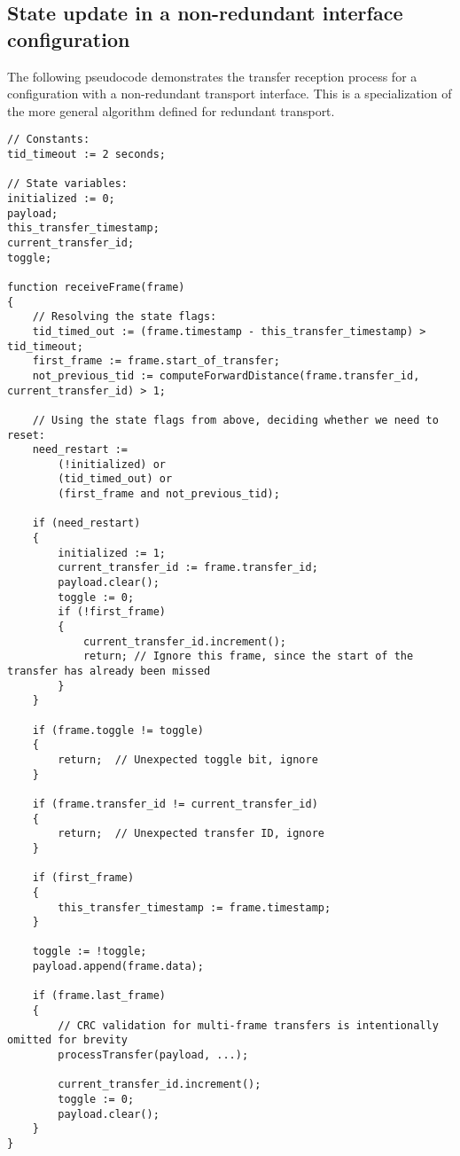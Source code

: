 \subsection{State update in a non-redundant interface configuration}
\label{sec:transfer_reception_state_update_non_redundant}

The following pseudocode demonstrates the transfer reception process for a configuration
with a non-redundant transport interface.
This is a specialization of the more general algorithm defined for redundant transport.

\clearpage
\begin{verbatim}
// Constants:
tid_timeout := 2 seconds;

// State variables:
initialized := 0;
payload;
this_transfer_timestamp;
current_transfer_id;
toggle;

function receiveFrame(frame)
{
    // Resolving the state flags:
    tid_timed_out := (frame.timestamp - this_transfer_timestamp) > tid_timeout;
    first_frame := frame.start_of_transfer;
    not_previous_tid := computeForwardDistance(frame.transfer_id, current_transfer_id) > 1;

    // Using the state flags from above, deciding whether we need to reset:
    need_restart :=
        (!initialized) or
        (tid_timed_out) or
        (first_frame and not_previous_tid);

    if (need_restart)
    {
        initialized := 1;
        current_transfer_id := frame.transfer_id;
        payload.clear();
        toggle := 0;
        if (!first_frame)
        {
            current_transfer_id.increment();
            return; // Ignore this frame, since the start of the transfer has already been missed
        }
    }

    if (frame.toggle != toggle)
    {
        return;  // Unexpected toggle bit, ignore
    }

    if (frame.transfer_id != current_transfer_id)
    {
        return;  // Unexpected transfer ID, ignore
    }

    if (first_frame)
    {
        this_transfer_timestamp := frame.timestamp;
    }

    toggle := !toggle;
    payload.append(frame.data);

    if (frame.last_frame)
    {
        // CRC validation for multi-frame transfers is intentionally omitted for brevity
        processTransfer(payload, ...);

        current_transfer_id.increment();
        toggle := 0;
        payload.clear();
    }
}
\end{verbatim}

\clearpage
